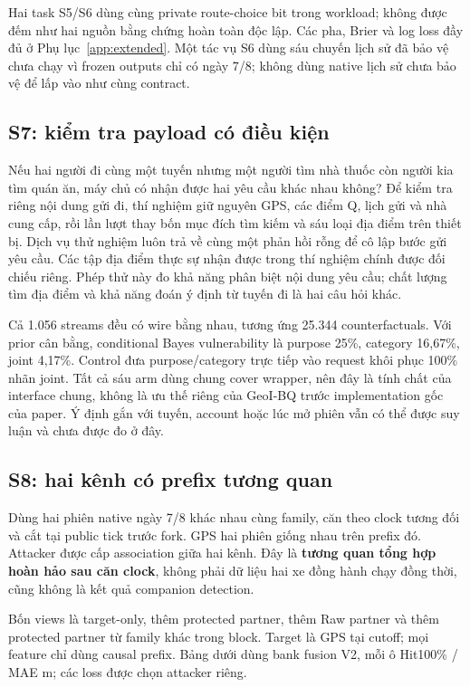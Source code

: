 Hai task S5/S6 dùng cùng private route-choice bit trong workload; không được đếm như hai nguồn
bằng chứng hoàn toàn độc lập. Các pha, Brier và log loss đầy đủ ở Phụ lục~\ref{app:extended}.
Một tác vụ S6 dùng sáu chuyến lịch sử đã bảo vệ chưa chạy vì frozen outputs chỉ có ngày 7/8;
không dùng native lịch sử chưa bảo vệ để lấp vào như cùng contract.

\subsection{S7: kiểm tra payload có điều kiện}
Nếu hai người đi cùng một tuyến nhưng một người tìm nhà thuốc còn người kia tìm quán ăn, máy chủ có nhận được hai yêu cầu khác nhau không? Để kiểm tra riêng nội dung gửi đi, thí nghiệm giữ nguyên GPS, các điểm Q, lịch gửi và nhà cung cấp, rồi lần lượt thay bốn mục đích tìm kiếm và sáu loại địa điểm trên thiết bị. Dịch vụ thử nghiệm luôn trả về cùng một phản hồi rỗng để cô lập bước gửi yêu cầu. Các tập địa điểm thực sự nhận được trong thí nghiệm chính được đối chiếu riêng. Phép thử này đo khả năng phân biệt nội dung yêu cầu; chất lượng tìm địa điểm và khả năng đoán ý định từ tuyến đi là hai câu hỏi khác.



Cả 1.056 streams đều có wire bằng nhau, tương ứng 25.344 counterfactuals. Với prior cân bằng,
conditional Bayes vulnerability là purpose 25\%, category 16,67\%, joint 4,17\%.
Control đưa purpose/category trực tiếp vào request khôi phục 100\% nhãn joint. Tất cả sáu arm dùng
chung cover wrapper, nên đây là tính chất của interface chung, không là ưu thế riêng của GeoI-BQ
trước implementation gốc của paper. Ý định gắn với tuyến, account hoặc lúc mở phiên vẫn có thể
được suy luận và chưa được đo ở đây.

\subsection{S8: hai kênh có prefix tương quan}
Dùng hai phiên native ngày 7/8 khác nhau cùng family, căn theo clock tương đối và cắt tại public
tick trước fork. GPS hai phiên giống nhau trên prefix đó. Attacker được cấp association giữa hai
kênh. Đây là \textbf{tương quan tổng hợp hoàn hảo sau căn clock}, không phải dữ liệu hai xe đồng
hành chạy đồng thời, cũng không là kết quả companion detection.

Bốn views là target-only, thêm protected partner, thêm Raw partner và thêm protected partner từ
family khác trong block. Target là GPS tại cutoff; mọi feature chỉ dùng causal prefix. Bảng dưới
dùng bank fusion V2, mỗi ô Hit100\% / MAE m; các loss được chọn attacker riêng.


